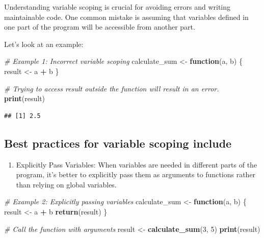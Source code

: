 \documentclass[
]{book}
\newenvironment{Shaded}{\begin{snugshade}}{\end{snugshade}}
\newcommand{\CommentTok}[1]{\textcolor[rgb]{0.56,0.35,0.01}{\textit{#1}}}
\newcommand{\ControlFlowTok}[1]{\textcolor[rgb]{0.13,0.29,0.53}{\textbf{#1}}}
\newcommand{\DecValTok}[1]{\textcolor[rgb]{0.00,0.00,0.81}{#1}}
\newcommand{\FunctionTok}[1]{\textcolor[rgb]{0.13,0.29,0.53}{\textbf{#1}}}
\newcommand{\NormalTok}[1]{#1}
\newcommand{\OtherTok}[1]{\textcolor[rgb]{0.56,0.35,0.01}{#1}}
\newcommand{\SpecialCharTok}[1]{\textcolor[rgb]{0.81,0.36,0.00}{\textbf{#1}}}
\providecommand{\tightlist}{%
  \setlength{\itemsep}{0pt}\setlength{\parskip}{0pt}}
\begin{document}
Understanding variable scoping is crucial for avoiding errors and writing maintainable code. One common mistake is assuming that variables defined in one part of the program will be accessible from another part.

Let's look at an example:

\begin{Shaded}
\begin{Highlighting}[]
\CommentTok{\# Example 1: Incorrect variable scoping}
\NormalTok{calculate\_sum }\OtherTok{\textless{}{-}} \ControlFlowTok{function}\NormalTok{(a, b) \{}
\NormalTok{  result }\OtherTok{\textless{}{-}}\NormalTok{ a }\SpecialCharTok{+}\NormalTok{ b}
\NormalTok{\}}

\CommentTok{\# Trying to access \textquotesingle{}result\textquotesingle{} outside the function will result in an error.}
\FunctionTok{print}\NormalTok{(result)}
\end{Highlighting}
\end{Shaded}

\begin{verbatim}
## [1] 2.5
\end{verbatim}

\hypertarget{best-practices-for-variable-scoping-include}{%
\subsection{Best practices for variable scoping include}\label{best-practices-for-variable-scoping-include}}

\begin{enumerate}
\def\labelenumi{\arabic{enumi}.}
\tightlist
\item
  Explicitly Pass Variables: When variables are needed in different parts of the program, it's better to explicitly pass them as arguments to functions rather than relying on global variables.
\end{enumerate}

\begin{Shaded}
\begin{Highlighting}[]
\CommentTok{\# Example 2: Explicitly passing variables}
\NormalTok{calculate\_sum }\OtherTok{\textless{}{-}} \ControlFlowTok{function}\NormalTok{(a, b) \{}
\NormalTok{  result }\OtherTok{\textless{}{-}}\NormalTok{ a }\SpecialCharTok{+}\NormalTok{ b}
  \FunctionTok{return}\NormalTok{(result)}
\NormalTok{\}}

\CommentTok{\# Call the function with arguments}
\NormalTok{result }\OtherTok{\textless{}{-}} \FunctionTok{calculate\_sum}\NormalTok{(}\DecValTok{3}\NormalTok{, }\DecValTok{5}\NormalTok{)}
\FunctionTok{print}\NormalTok{(result) }
\end{Highlighting}
\end{Shaded}
\end{document}

